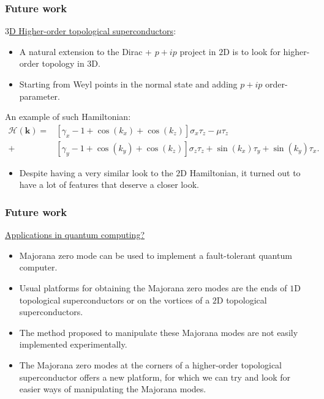 \documentclass{beamer}
\newcommand{\mc}{\mathcal}
\renewcommand{\(}{\left(}
\renewcommand{\)}{\right)}
\renewcommand{\[}{\left[}
\renewcommand{\]}{\right]}
\begin{document}
\begin{frame}
    \frametitle{Future work}
    \underline{$3$D Higher-order topological superconductors}: 
    \begin{itemize}
        \item A natural extension to the Dirac + $p+ip$ project in $2$D is to look for higher-order topology in $3$D.
        \item Starting from Weyl points in the normal state and adding $p + ip$ order-parameter. 
    \end{itemize}
    An example of such Hamiltonian: 
    \begin{align*}
        \mc H(\bm k) =& \[\gamma_x - 1 + \cos(k_x) + \cos(k_z)\] \sigma_x \tau_z - \mu \tau_z \\
        + &\[\gamma_y  - 1 + \cos(k_y) + \cos(k_z)\] \sigma_z \tau_z  + \sin(k_x) \tau_y + \sin(k_y)\tau_x. 
    \end{align*}
    \begin{itemize}
        \item Despite having a very similar look to the $2$D Hamiltonian, it turned out to have a lot of features that deserve a closer look. 
    \end{itemize}
\end{frame}

\begin{frame}
    \frametitle{Future work}
    \underline{Applications in quantum computing?}
    \begin{itemize}
        \item Majorana zero mode can be used to implement a fault-tolerant quantum computer. \citet*{Kitaev_2003}
        \item Usual platforms for obtaining the Majorana zero modes are the ends of $1$D topological superconductors or on the vortices of a $2$D topological superconductors. 
        \item The method proposed to manipulate these Majorana modes are not easily implemented experimentally. 
        \item The Majorana zero modes at the corners of a higher-order topological superconductor offers a new platform, for which we can try and look for easier ways of manipulating the Majorana modes. 
    \end{itemize}
\end{frame}



\end{document}
